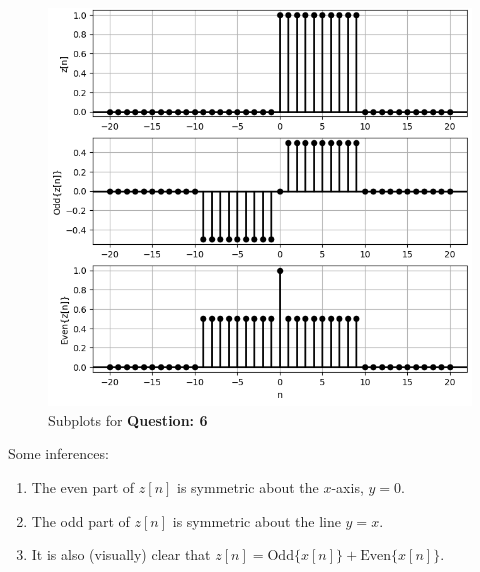\documentclass{article}
\begin{document}
    \begin{figure}[h]
        \includegraphics[scale=0.9]{./Assets/solution-6.png}
        \caption*{Subplots for \textbf{Question: 6}}
    \end{figure}

    Some inferences:
    \begin{enumerate}
        \item The even part of $z[n]$ is symmetric about the $x$-axis, $y = 0$.
        \item The odd part of $z[n]$ is symmetric about the line $y = x$.
        \item It is also (visually) clear that $z[n] = \text{Odd}\{x[n]\} + \text{Even}\{x[n]\}$.
    \end{enumerate}
\end{document}
